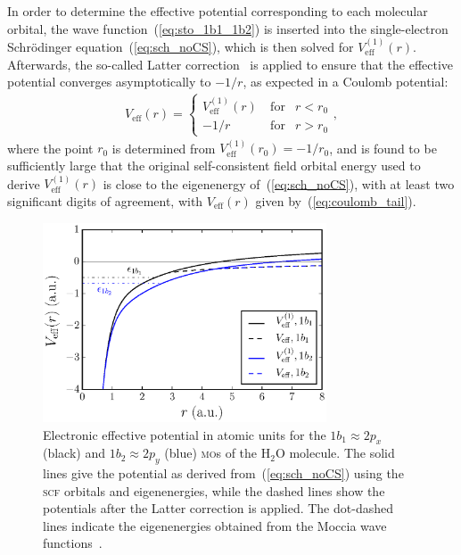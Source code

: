 In order to determine the effective potential corresponding to each
molecular orbital, the wave function~(\ref{eq:sto_1b1_1b2}) is inserted
into the single-electron Schr\"{o}dinger equation~(\ref{eq:sch_noCS}),
which is then solved for $V_{\mathrm{eff}}^{(1)}(r)$. Afterwards, the
so-called Latter correction~\cite{LatterCor_1955,sarias_2016} is
applied to ensure that the effective potential converges
asymptotically to $-1/r$, as expected in a Coulomb potential:
%
\begin{eqnarray}
V_{\mathrm{eff}}(r) = \left\{
\begin{split}
V_{\mathrm{eff}}^{(1)}(r)\  & \mathrm{for} & r < r_{0} \\
-1/r\  & \mathrm{for} & r > r_{0}
\end{split}
\right.
,
\label{eq:coulomb_tail}
\end{eqnarray}
%
where the point $r_{0}$ is determined from $V_{\mathrm{eff}}^{(1)}(r_{0}) =
-1/r_{0}$, and is found to be sufficiently large that the original
self-consistent field orbital energy used to derive
$V_{\mathrm{eff}}^{(1)}(r)$ is close to the eigenenergy
of~(\ref{eq:sch_noCS}), with at least two significant digits of
agreement, with $V_{\mathrm{eff}}(r)$ given
by~(\ref{eq:coulomb_tail}).

\begin{figure}
  \centering
  \includegraphics[width=0.75\textwidth]{figures/ch_H2O/1b1_1b2/Veff1b11b2.eps}
  \caption{Electronic effective potential in atomic units for the
    $1b_{1}\approx 2p_{x}$ (black) and $1b_{2}\approx 2p_{y}$ (blue)
    \textsc{mo}s of the H$_{2}$O molecule. The solid lines give the
    potential as derived from~(\ref{eq:sch_noCS}) using the
    \textsc{scf} orbitals and eigenenergies, while the dashed lines
    show the potentials after the Latter correction is applied. The
    dot-dashed lines indicate the eigenenergies obtained from the
    Moccia wave functions~\cite{Moccia_1964}.}
  \label{fig:Veff1b11b2}
\end{figure}

